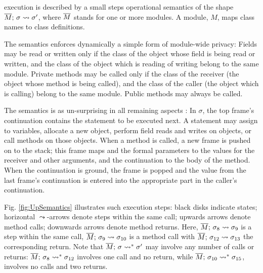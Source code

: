  \LangOO execution is described by a small steps operational semantics of the shape $\overline{M};\, \sigma \leadsto {\sigma'}$, where 
 $\overline{M}$ stands for one or more modules.
 A module,  $M$, maps class names to class definitions. 
   
{The semantics enforces dynamically a simple form of module-wide privacy: 
Fields may be read or written only if the class of the object whose field is being read or written, and the class of the object which is reading of writing belong to the same module.}
Private methods may be called only if the class of the receiver (the object whose method is being called), and the class of the caller (the object which is calling) belong to the same module.
Public methods may always be called.

The semantics is as un-surprising in  all remaining aspects  :  
In $\sigma$, the  top frame's continuation contains the statement to be  executed next.  
 A statement may assign to variables, allocate a new object, 
perform field reads and writes on objects,  or
 call methods on those objects. 
When a method is called, a new frame is pushed on to the stack; this frame  maps  and the formal parameters to  the values for the receiver and other arguments, and the continuation to the body of the method.  When the continuation is ground, the frame is popped and the value from the last frame's continuation is entered into the appropriate part in the caller's continuation. 


{Fig. \ref{fig:UpSemantics} illustrates  such  execution steps:  black disks indicate states;
 horizontal $\leadsto$-arrows denote   steps  within the same  call; upwards arrows denote  method calls;
 downwards arrows denote method returns. %
 Here,   $\overline{M};\, \sigma_8 \leadsto {\sigma_9} $ is a step within the same call, $\overline{M};\, \sigma_9 \leadsto {\sigma_{10}} $ is a method call   
with $\overline{M};\, \sigma_{12} \leadsto {\sigma_{13}} $ %
the corresponding return. 
 {Note that  $\overline{M};\, \sigma \leadsto^* {\sigma'}$ may involve  any number of  calls or returns: 
 $\overline{M};\, \sigma_8 \leadsto^* {\sigma_{12}}$ involves one call and no return,
while $\overline{M};\, \sigma_{10} \leadsto^* {\sigma_{15}}$,   involves no calls and two returns.
}
} 

